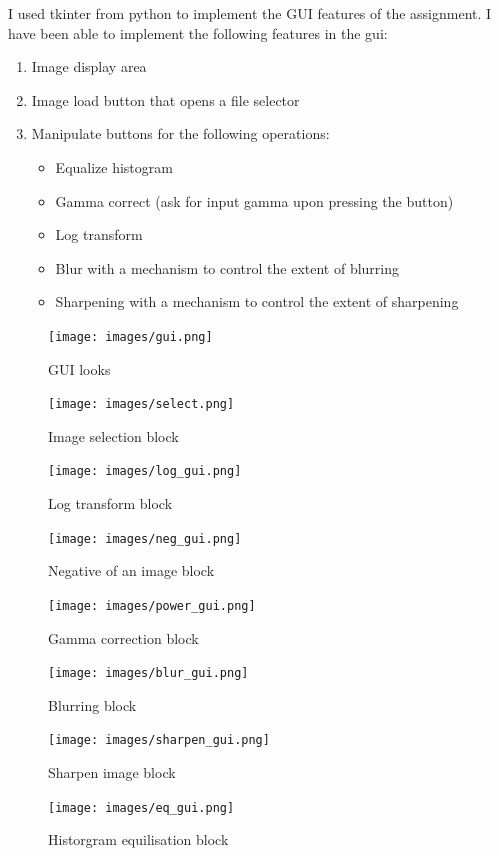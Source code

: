 \documentclass[conference]{IEEEtran}
\begin{document}
{{I used tkinter from python to implement the GUI features of the assignment.
I have been able to implement the following features in the gui:
\begin{enumerate}
    \item  Image display area
    \item  Image load button that opens a file selector
    \item Manipulate buttons for the following operations:
    \begin{itemize}
        \item  Equalize histogram
        \item Gamma correct (ask for input gamma upon pressing the button)
        \item Log transform
        \item Blur with a mechanism to control the extent of blurring
        \item Sharpening with a mechanism to control the extent of sharpening
    \end{itemize}
\end{enumerate}
\begin{figure}[htbp]
\centerline{\texttt{[image: images/gui.png]}}
\caption{GUI looks}
\label{fig:gui_1}
\end{figure}
\begin{figure}[htbp]
\centerline{\texttt{[image: images/select.png]}}
\caption{Image selection block}
\label{fig:gui_1}
\end{figure}
\begin{figure}[htbp]
\centerline{\texttt{[image: images/log\_gui.png]}}
\caption{Log transform block}
\label{fig:gui_1}
\end{figure}
\begin{figure}[htbp]
\centerline{\texttt{[image: images/neg\_gui.png]}}
\caption{Negative of an image block}
\label{fig:gui_1}
\end{figure}
\begin{figure}[htbp]
\centerline{\texttt{[image: images/power\_gui.png]}}
\caption{Gamma correction block}
\label{fig:gui_1}
\end{figure}
\begin{figure}[htbp]
\centerline{\texttt{[image: images/blur\_gui.png]}}
\caption{Blurring block}
\label{fig:gui_1}
\end{figure}
\begin{figure}[htbp]
\centerline{\texttt{[image: images/sharpen\_gui.png]}}
\caption{Sharpen image block}
\label{fig:gui_1}
\end{figure}
\begin{figure}[htbp]
\centerline{\texttt{[image: images/eq\_gui.png]}}
\caption{Historgram equilisation block}
\label{fig:gui_1}
\end{figure}

}}
\end{document}
